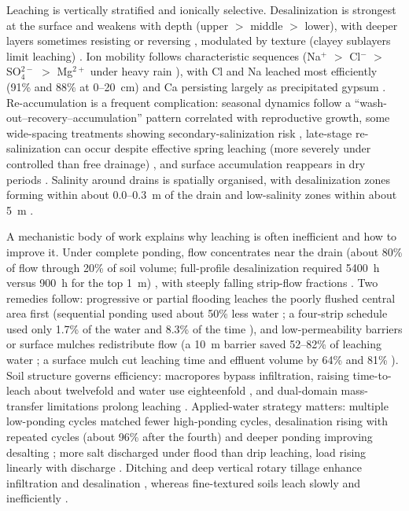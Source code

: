 Leaching is vertically stratified and ionically selective. Desalinization is
strongest at the surface and weakens with depth (upper $>$ middle $>$ lower), with
deeper layers sometimes resisting or reversing
\parencite{Chen2022,Han2023,Narjary2024,Tian2024}, modulated by texture
(clayey sublayers limit leaching) \parencite{Qin2025}. Ion mobility follows
characteristic sequences (Na$^+$ $>$ Cl$^-$ $>$ SO$_4^{2-}$ $>$ Mg$^{2+}$ under
heavy rain \parencite{Yu2016}), with Cl and Na leached most efficiently
(91\% and 88\% at 0--20~cm) and Ca persisting largely as precipitated gypsum
\parencite{Qian2025,Sharma2000}. Re-accumulation is a frequent complication:
seasonal dynamics follow a ``wash-out--recovery--accumulation'' pattern
correlated with reproductive growth, some wide-spacing treatments showing
secondary-salinization risk \parencite{Zhu2025b}, late-stage re-salinization can
occur despite effective spring leaching (more severely under controlled than free
drainage) \parencite{Dou2022}, and surface accumulation reappears in dry periods
\parencite{Yu2016,Shi2021b}. Salinity around drains is spatially organised, with
desalinization zones forming within about 0.0--0.3~m of the drain and low-salinity
zones within about 5~m
\parencite{Lu2019,Heng2021,Han2023,Mirlas2003,Benyamini2005}.

A mechanistic body of work explains why leaching is often inefficient and how to
improve it. Under complete ponding, flow concentrates near the drain (about 80\%
of flow through 20\% of soil volume; full-profile desalinization required 5400~h
versus 900~h for the top 1~m) \parencite{RAO1991}, with steeply falling
strip-flow fractions \parencite{Youngs2000}. Two remedies follow: progressive or
partial flooding leaches the poorly flushed central area first (sequential
ponding used about 50\% less water \parencite{RAO1991}; a four-strip schedule used
only 1.7\% of the water and 8.3\% of the time \parencite{Youngs2000}), and
low-permeability barriers or surface mulches redistribute flow (a 10~m barrier
saved 52--82\% of leaching water \parencite{Yu2018}; a surface mulch cut leaching
time and effluent volume by 64\% and 81\% \parencite{Zhang2022}). Soil structure
governs efficiency: macropores bypass infiltration, raising time-to-leach about
twelvefold and water use eighteenfold \parencite{Xin2016}, and dual-domain
mass-transfer limitations prolong leaching \parencite{Zhang2024}. Applied-water
strategy matters: multiple low-ponding cycles matched fewer high-ponding cycles,
desalination rising with repeated cycles (about 96\% after the fourth) and
deeper ponding improving desalting \parencite{Jia2023}; more salt discharged
under flood than drip leaching, load rising linearly with discharge
\parencite{Li2022}. Ditching and deep vertical rotary tillage enhance
infiltration and desalination \parencite{Tian2023,Li2026}, whereas fine-textured
soils leach slowly and inefficiently \parencite{MANN1982}.

